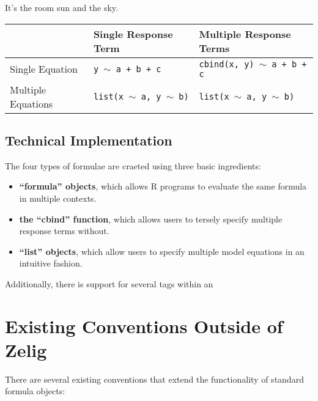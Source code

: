 \documentclass{article}
\newcommand{\tweedly}[0]{$\sim${ }}
\begin{document}
It's the room sun and the sky.

{\noindent}\begin{tabular}{|l|l|l|}

  \hline

  & Single Response Term & Multiple Response Terms \\ \hline

  Single Equation &
  {\tt y \tweedly a + b + c} & {\tt cbind(x, y) \tweedly a + b + c}
  \\ \hline

  Multiple Equations & 
  {\tt list(x \tweedly a, y \tweedly b)} &
  {\tt list(x \tweedly a, y \tweedly b)} \\ \hline


\end{tabular}

\subsection{Technical Implementation}

The four types of formulae are craeted using three basic ingredients:

\begin{itemize}

  \item {\bf ``formula'' objects}, which allows R programs to evaluate the
    same formula in multiple contexts.

  \item {\bf the ``cbind'' function}, which allows users to tersely specify
    multiple response terms without.

  \item {\bf ``list'' objects}, which allow users to specify multiple
    model equations in an intuitive fashion.

\end{itemize}

Additionally, there is support for several tags within an



%
%
%
\section{Existing Conventions Outside of Zelig}
\label{sec:existing-elsewhere}

There are several existing conventions that extend the functionality of standard
formula objects:
\end{document}
